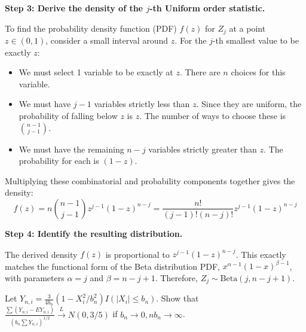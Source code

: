 \begin{solution}
\textbf{Step 3: Derive the density of the $j$-th Uniform order statistic.}

To find the probability density function (PDF) $f(z)$ for $Z_j$ at a point $z \in (0, 1)$, consider a small interval around $z$. For the $j$-th smallest value to be exactly $z$:
\begin{itemize}
    \item We must select 1 variable to be exactly at $z$. There are $n$ choices for this variable.
    \item We must have $j-1$ variables strictly less than $z$. Since they are uniform, the probability of falling below $z$ is $z$. The number of ways to choose these is $\binom{n-1}{j-1}$.
    \item We must have the remaining $n-j$ variables strictly greater than $z$. The probability for each is $(1-z)$.
\end{itemize}
Multiplying these combinatorial and probability components together gives the density:
\[ f(z) = n \binom{n-1}{j-1} z^{j-1} (1-z)^{n-j} = \frac{n!}{(j-1)!(n-j)!} z^{j-1} (1-z)^{n-j} \]

\textbf{Step 4: Identify the resulting distribution.}

The derived density $f(z)$ is proportional to $z^{j-1} (1-z)^{n-j}$.
This exactly matches the functional form of the Beta distribution PDF, $x^{\alpha-1}(1-x)^{\beta-1}$, with parameters $\alpha = j$ and $\beta = n - j + 1$.
Therefore, $Z_j \sim \text{Beta}(j, n-j+1)$.
\end{solution}

\begin{exercise}\label{probability:2010:8}
Let $Y_{n,i} = \frac{3}{4b_n}(1 - X_i^2/b_n^2) I(|X_i| \leq b_n)$. Show that $\frac{\sum (Y_{n,i} - E Y_{n,i})}{(b_n \sum Y_{n,i})^{1/2}} \xrightarrow{L} N(0, 3/5)$ if $b_n \to 0, n b_n \to \infty$.
\end{exercise}

